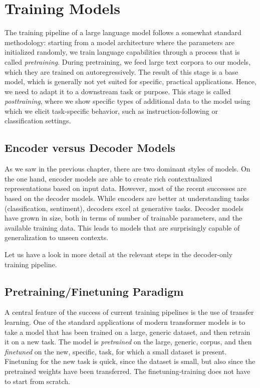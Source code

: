 \section{Training Models}

The training pipeline of a large language model follows a somewhat standard methodology: starting from a  model architecture where the parameters are initialized randomly, we train language capabilities through a process that is called {\em pretraining}. During pretraining, we feed large text corpora to our models, which they are trained on autoregressively. The result of this stage is a base model, which is generally not yet suited for specific, practical applications. Hence, we need to adapt it to a downstream task or purpose. This stage is called {\em posttraining}, where we show specific types of additional data to the model using which we elicit task-specific behavior, such as instruction-following or classification settings. 

\subsection{Encoder versus Decoder Models}
As we saw in the previous chapter, there are  two dominant styles of models. On the one hand, encoder models are able to create rich contextualized representations based on input data. However, most of the recent successes are based on the decoder models. While encoders are better at understanding tasks (classification, sentiment), decoders excel at generative tasks. Decoder models have grown in size, both in terms of number of trainable parameters, and the available training data. This leads to models that are surprisingly capable of generalization to unseen contexts.

Let us have a look in more detail at the %
relevant steps in the decoder-only training pipeline.


\subsection{Pretraining/Finetuning Paradigm}


A central feature of the success of current training pipelines is the use of transfer learning. One of the standard applications of modern transformer models is to take a model that has been trained on a large, generic dataset, and then retrain it on a new task. The model is {\em pretrained} on the large, generic, corpus, and then {\em finetuned} on the new, specific, task, for which a small dataset is present. Finetuning for the new task is quick, since the dataset is small, but also since the pretrained weights have been transferred. The finetuning-training does not have to start from scratch. 

